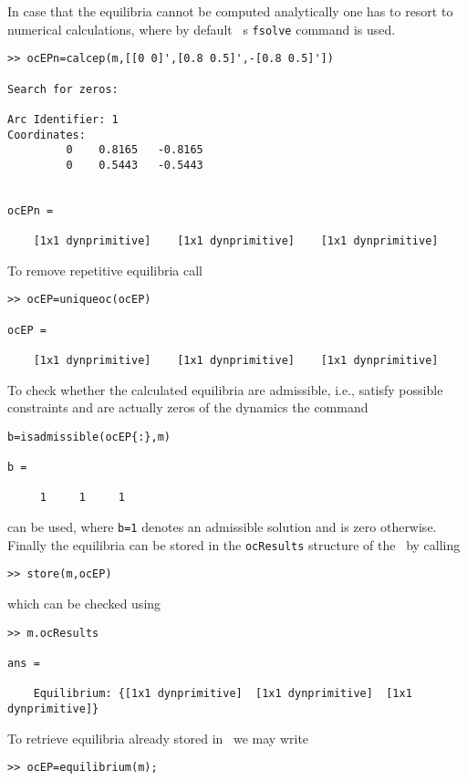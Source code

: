 In case that the equilibria cannot be computed analytically one has to resort to numerical calculations, where by default \MATL\ s \lstinline+fsolve+ command is used. 
\begin{lstlisting}
>> ocEPn=calcep(m,[[0 0]',[0.8 0.5]',-[0.8 0.5]'])

Search for zeros: 

Arc Identifier: 1
Coordinates:
         0    0.8165   -0.8165
         0    0.5443   -0.5443


ocEPn = 

    [1x1 dynprimitive]    [1x1 dynprimitive]    [1x1 dynprimitive]
\end{lstlisting}
To remove repetitive equilibria call
\begin{lstlisting}
>> ocEP=uniqueoc(ocEP)

ocEP = 

    [1x1 dynprimitive]    [1x1 dynprimitive]    [1x1 dynprimitive]
\end{lstlisting}
To check whether the calculated equilibria are admissible, i.e., satisfy possible constraints and are actually zeros of the dynamics the command 
\begin{lstlisting}
b=isadmissible(ocEP{:},m)	

b =

     1     1     1
\end{lstlisting}
can be used, where \lstinline+b=1+ denotes an admissible solution and is zero otherwise. Finally the equilibria can be stored in the \lstinline+ocResults+ structure of the \ocmodel\ by calling
\begin{lstlisting}
>> store(m,ocEP)	
\end{lstlisting}
which can be checked using
\begin{lstlisting}
>> m.ocResults

ans = 

    Equilibrium: {[1x1 dynprimitive]  [1x1 dynprimitive]  [1x1 dynprimitive]}
\end{lstlisting}
To retrieve equilibria already stored in \ocvar\ we may write
\begin{lstlisting}
>> ocEP=equilibrium(m);
\end{lstlisting}

